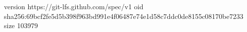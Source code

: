version https://git-lfs.github.com/spec/v1
oid sha256:69bcf2fe5d5b398f963bd991e4f06487e74e1d58c7ddc0de8155c08170be7233
size 103979
